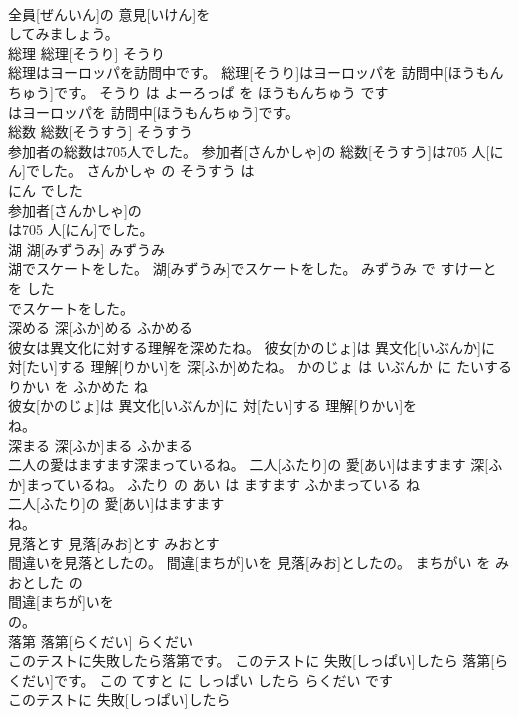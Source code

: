\documentclass[8pt]{extreport}
\begin{document}
\begin{CJK}{UTF8}{min}
\\	全員[ぜんいん]の 意見[いけん]を
\\	してみましょう。			
\\	総理	総理[そうり]	そうり	
\\	総理はヨーロッパを訪問中です。	総理[そうり]はヨーロッパを 訪問中[ほうもんちゅう]です。	そうり は よーろっぱ を ほうもんちゅう です	
\\	はヨーロッパを 訪問中[ほうもんちゅう]です。			
\\	総数	総数[そうすう]	そうすう	
\\	参加者の総数は705人でした。	参加者[さんかしゃ]の 総数[そうすう]は705 人[にん]でした。	さんかしゃ の そうすう は 
\\	にん でした	
\\	参加者[さんかしゃ]の
\\	は705 人[にん]でした。			
\\	湖	湖[みずうみ]	みずうみ	
\\	湖でスケートをした。	湖[みずうみ]でスケートをした。	みずうみ で すけーと を した	
\\	でスケートをした。			
\\	深める	深[ふか]める	ふかめる	
\\	彼女は異文化に対する理解を深めたね。	彼女[かのじょ]は 異文化[いぶんか]に 対[たい]する 理解[りかい]を 深[ふか]めたね。	かのじょ は いぶんか に たいする りかい を ふかめた ね	
\\	彼女[かのじょ]は 異文化[いぶんか]に 対[たい]する 理解[りかい]を
\\	ね。			
\\	深まる	深[ふか]まる	ふかまる	
\\	二人の愛はますます深まっているね。	二人[ふたり]の 愛[あい]はますます 深[ふか]まっているね。	ふたり の あい は ますます ふかまっている ね	
\\	二人[ふたり]の 愛[あい]はますます
\\	ね。			
\\	見落とす	見落[みお]とす	みおとす	
\\	間違いを見落としたの。	間違[まちが]いを 見落[みお]としたの。	まちがい を みおとした の	
\\	間違[まちが]いを
\\	の。			
\\	落第	落第[らくだい]	らくだい	
\\	このテストに失敗したら落第です。	このテストに 失敗[しっぱい]したら 落第[らくだい]です。	この てすと に しっぱい したら らくだい です	
\\	このテストに 失敗[しっぱい]したら

\end{CJK}
\end{document}
